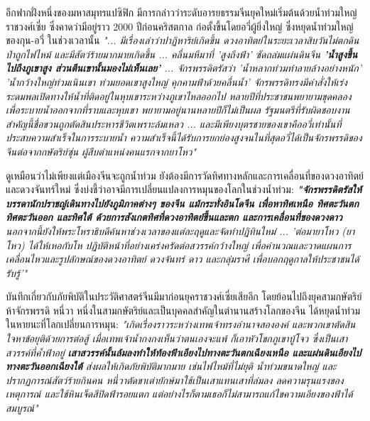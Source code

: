 \documentclass[10pt,twocolumn,letterpaper]{article}
\begin{document}
อีกฟากฝั่งหนึ่งของมหาสมุทรแปซิฟิก มีการกล่าวว่าระดับอารยธรรมจีนยุคใหม่เริ่มต้นด้วยน้ำท่วมใหญ่ ราชวงศ์เซี่ย ซึ่งคาดว่ามีอยู่ราว 2000 ปีก่อนคริสตกาล ก่อตั้งขึ้นโดยอวี่ผู้ยิ่งใหญ่ ซึ่งหยุดน้ำท่วมใหญ่ของกุน-อวี่ \cite{6} ในช่วงเวลานั้น \textit{"... มีเรื่องเล่าว่าปาฏิหาริย์เกิดขึ้น ดวงอาทิตย์ในระยะเวลาสิบวันไม่ตกดิน ป่าถูกไฟไหม้ และมีสัตว์ร้ายมากมายเกิดขึ้น ... คลื่นมหึมาที่ 'สูงถึงฟ้า' ซัดถล่มแผ่นดินจีน \textbf{'น้ำสูงขึ้นไปถึงภูเขาสูง ส่วนตีนเขานั้นมองไม่เห็นเลย'} ... จักรพรรดิตรัสว่า 'น้ำหลากท่วมทำลายล้างอย่างหนัก' 'น้ำกว้างใหญ่ท่วมเนินเขา ท่วมยอดเขาสูงใหญ่ คุกคามฟ้าด้วยคลื่นน้ำ' จักรพรรดิทรงมีคำสั่งให้เร่งระดมพลเปิดทางให้น้ำที่ติดอยู่ในหุบเขาระหว่างภูเขาไหลออกไป หลายปีที่ประชาชนพยายามขุดคลองเพื่อระบายน้ำออกจากที่ราบและหุบเขา พยายามอยู่นานหลายปีก็ไม่เป็นผล รัฐมนตรีที่รับผิดชอบงานสำคัญนี้ชื่อขวนถูกตัดสินประหารชีวิตเพราะล้มเหลว ... และมีเพียงบุตรชายของเขาคืออวี่เท่านั้นที่ประสบความสำเร็จในการระบายน้ำ ความสำเร็จนี้ได้รับการยกย่องสูงจนในที่สุดอวี่ได้เป็นจักรพรรดิของจีนต่อจากกษัตริย์ซุ่น ผู้สืบตำแหน่งคนแรกจากยาโหว"} \cite{5}

ดูเหมือนว่าไม่เพียงแต่เมืองจีนจะถูกน้ำท่วม ยังต้องมีการวัดทิศทางหลักและการเคลื่อนที่ของดวงอาทิตย์และดวงจันทร์ใหม่ ซึ่งบ่งชี้ว่าอาจมีการเปลี่ยนแปลงการหมุนของโลกในช่วงน้ำท่วม: \textit{\textbf{"จักรพรรดิตรัสให้บรรดานักปราชญ์เดินทางไปยังภูมิภาคต่างๆ ของจีน แม้กระทั่งอินโดจีน เพื่อหาทิศเหนือ ทิศตะวันตก ทิศตะวันออก และทิศใต้ ด้วยการสังเกตทิศที่ดวงอาทิตย์ขึ้นและตก และการเคลื่อนที่ของดวงดาว} นอกจากนี้ยังให้พระโหราธิบดีค้นหาช่วงเวลาของแต่ละฤดูและจัดทำปฏิทินใหม่ ... 'ต่อมายาโหว (ยาโหว) ได้ให้เหอกับโห ปฏิบัติหน้าที่อย่างเคร่งครัดต่อสวรรค์กว้างใหญ่ เพื่อคำนวณและวาดแผนการเคลื่อนไหวและรูปลักษณ์ของดวงอาทิตย์ ดวงจันทร์ ดาว และกลุ่มราศี เพื่อบอกฤดูกาลให้ประชาชนได้รับรู้'"} \cite{5}

บันทึกเกี่ยวกับภัยพิบัติในประวัติศาสตร์จีนมีมาก่อนยุคราชวงศ์เซี่ยเสียอีก โดยย้อนไปถึงยุคสามกษัตริย์ห้าจักรพรรดิ \cite{7} หนี่วา หนึ่งในสามกษัตริย์และเป็นบุคคลสำคัญในตำนานสร้างโลกของจีน ได้หยุดน้ำท่วมในหายนะที่โลกเปลี่ยนการหมุน: \textit{"เกิดเรื่องราวระหว่างเทพเจ้าทรงอำนาจสององค์ และพวกเขาตัดสินใจหาข้อยุติด้วยการต่อสู้ เมื่อเทพเจ้าน้ำกงกงเห็นว่าตนเองจะแพ้ ก็เอาหัวโขกภูเขาบู้โจว ซึ่งเป็นเสาสวรรค์ที่ค้ำฟ้าอยู่ \textbf{เสาสวรรค์นั้นล้มลงทำให้ท้องฟ้าเอียงไปทางตะวันตกเฉียงเหนือ และแผ่นดินเอียงไปทางตะวันออกเฉียงใต้} ส่งผลให้เกิดภัยพิบัติมากมาย เช่นไฟไหม้ที่ไม่ยุติ น้ำท่วมขนาดใหญ่ และปรากฏการณ์สัตว์ร้ายกินคน หนี่วาตัดขาเต่ายักษ์มาใช้เป็นเสาแทนเสาที่ล่มลง ลดความรุนแรงของเหตุการณ์ และใช้หินเจ็ดสีปิดฟ้ารอยแตก แต่อย่างไรก็ตามเธอก็ไม่สามารถแก้ไขความเอียงของฟ้าได้สมบูรณ์"} \cite{8}
\end{document}
